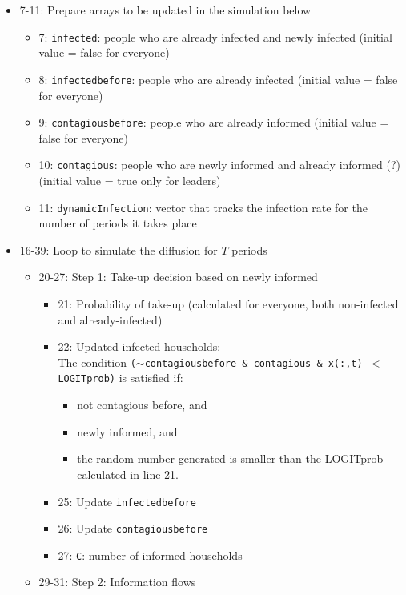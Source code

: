 \documentclass[10pt,letterpaper]{article}
\begin{document}
\begin{itemize}
  \item 7-11: Prepare arrays to be updated in the simulation below
    \begin{itemize}
      \item 7: \texttt{infected}: people who are already infected and newly infected (initial value = false for everyone)
      \item 8: \texttt{infectedbefore}: people who are already infected (initial value = false for everyone)
      \item 9: \texttt{contagiousbefore}: people who are already informed (initial value = false for everyone)
      \item 10: \texttt{contagious}: people who are newly informed and already informed (?) (initial value = true only for leaders)
      \item 11: \texttt{dynamicInfection}: vector that tracks the infection rate for the number of periods it takes place
    \end{itemize}
  \item 16-39: Loop to simulate the diffusion for $T$ periods
    \begin{itemize}
      \item 20-27: Step 1: Take-up decision based on newly informed
        \begin{itemize}
          \item 21: Probability of take-up (calculated for everyone, both non-infected and already-infected)
          \item 22: Updated infected households: \\
            The condition \texttt{($\sim$contagiousbefore \& contagious \& x(:,t) $<$ LOGITprob)} is satisfied if:
            \begin{itemize}
              \item not contagious before, and 
              \item newly informed, and
              \item the random number generated is smaller than the LOGITprob calculated in line 21.
            \end{itemize}
          \item 25: Update \texttt{infectedbefore}
          \item 26: Update \texttt{contagiousbefore}
          \item 27: \texttt{C}: number of informed households
        \end{itemize}
      \item 29-31: Step 2: Information flows

\end{itemize}
\end{itemize}
\end{document}

